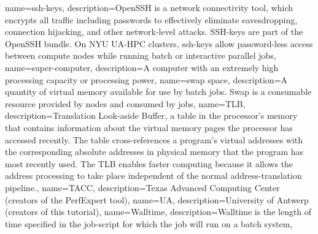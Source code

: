 {
  name={ssh-keys},
  description={OpenSSH is a network connectivity tool, which encrypts all traffic including passwords to effectively eliminate eavesdropping, connection hijacking, and other network-level attacks. SSH-keys are part of the OpenSSH bundle. On NYU UA-HPC clusters, ssh-keys allow password-less access between compute nodes while running batch or interactive parallel jobs},
}
{
  name={super-computer},
  description={A computer with an extremely high processing capacity or processing power},
}
{
  name={swap space},
  description={A quantity of virtual memory available for use by batch jobs. Swap is a consumable resource provided by nodes and consumed by jobs},
}
{
  name={TLB},
  description={Translation\textbf{\textit{ }}Look-aside Buffer\textit{,} a table in the processor's memory that contains information about the virtual memory pages the processor has accessed recently. The table cross-references a program's virtual addresses with the corresponding absolute addresses in physical memory that the program has most recently used. The TLB enables faster computing because it allows the address processing to take place independent of the normal address-translation pipeline.},
}
{
  name={TACC},
  description={Texas Advanced Computing Center (creators of the PerfExpert tool)},
}
{
  name={UA},
  description={University of Antwerp (creators of this tutorial)},
}
{
  name={Walltime},
  description={Walltime is the length of time specified in the job-script for which the job will run on a batch system},
}
